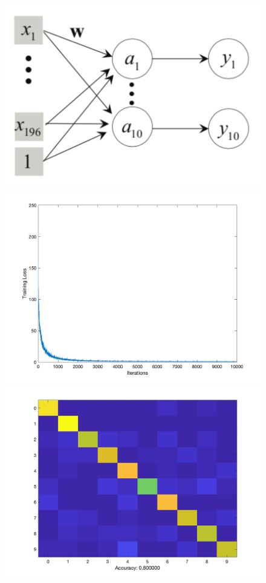 \documentclass[letter, 11pt]{article}
\begin{document}
\begin{figure}[H]
        \centering
        \includegraphics[width=\textwidth]{HW4/RESULT/SLP_linear.png}
    \endminipage\hfill
        \centering
        \includegraphics[width=1.1\textwidth]{HW4/RESULT/SLP_linear_loss.png}
    \endminipage\hfill
        \centering
        \includegraphics[width=1.1\textwidth]{HW4/RESULT/SLPLINEAR_CONFUSION.png}

\end{figure}
\end{document}
